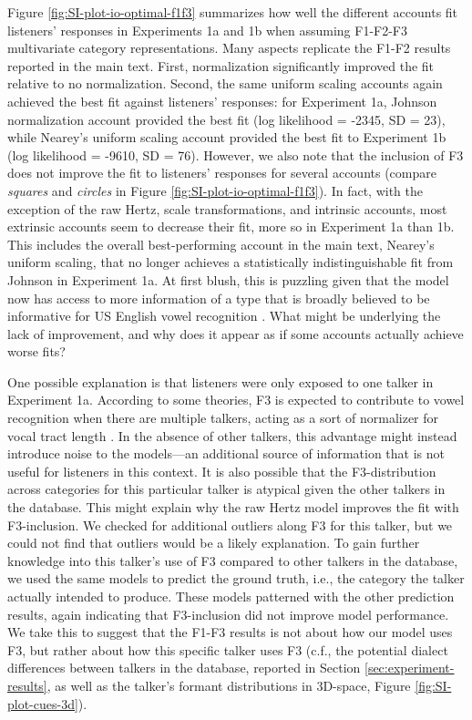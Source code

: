 \documentclass[preprint]{JASA}
\begin{document}
Figure \ref{fig:SI-plot-io-optimal-f1f3} summarizes how well the different accounts fit listeners' responses in Experiments 1a and 1b when assuming F1-F2-F3 multivariate category representations. Many aspects replicate the F1-F2 results reported in the main text. First, normalization significantly improved the fit relative to no normalization. Second, the same uniform scaling accounts again achieved the best fit against listeners' responses: for Experiment 1a, Johnson normalization account provided the best fit (log likelihood = -2345, SD = 23), while Nearey's uniform scaling account provided the best fit to Experiment 1b (log likelihood = -9610, SD = 76). However, we also note that the inclusion of F3 does not improve the fit to listeners' responses for several accounts (compare \emph{squares} and \emph{circles} in Figure \ref{fig:SI-plot-io-optimal-f1f3}). In fact, with the exception of the raw Hertz, scale transformations, and intrinsic accounts, most extrinsic accounts seem to decrease their fit, more so in Experiment 1a than 1b. This includes the overall best-performing account in the main text, Nearey's uniform scaling, that no longer achieves a statistically indistinguishable fit from Johnson in Experiment 1a. At first blush, this is puzzling given that the model now has access to more information of a type that is broadly believed to be informative for US English vowel recognition \citep{hillenbrand1995, peterson1952, nearey1989}. What might be underlying the lack of improvement, and why does it appear as if some accounts actually achieve worse fits?

One possible explanation is that listeners were only exposed to one talker in Experiment 1a. According to some theories, F3 is expected to contribute to vowel recognition when there are multiple talkers, acting as a sort of normalizer for vocal tract length \citep{nearey1989}. In the absence of other talkers, this advantage might instead introduce noise to the models---an additional source of information that is not useful for listeners in this context. It is also possible that the F3-distribution across categories for this particular talker is atypical given the other talkers in the database. This might explain why the raw Hertz model improves the fit with F3-inclusion. We checked for additional outliers along F3 for this talker, but we could not find that outliers would be a likely explanation. To gain further knowledge into this talker's use of F3 compared to other talkers in the database, we used the same models to predict the ground truth, i.e., the category the talker actually intended to produce. These models patterned with the other prediction results, again indicating that F3-inclusion did not improve model performance. We take this to suggest that the F1-F3 results is not about how our model uses F3, but rather about how this specific talker uses F3 (c.f., the potential dialect differences between talkers in the database, reported in Section \ref{sec:experiment-results}, as well as the talker's formant distributions in 3D-space, Figure \ref{fig:SI-plot-cues-3d}).
\end{document}

